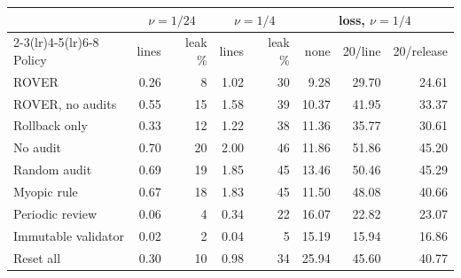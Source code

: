 \begin{tabular}{lrrrrrrr}
\toprule
 & \multicolumn{2}{c}{$\nu=1/24$} & \multicolumn{2}{c}{$\nu=1/4$} & \multicolumn{3}{c}{loss, $\nu=1/4$} \\
\cmidrule(lr){2-3}\cmidrule(lr){4-5}\cmidrule(lr){6-8}
Policy & lines & leak \% & lines & leak \% & none & 20/line & 20/release \\
\midrule
ROVER & 0.26 & 8 & 1.02 & 30 & 9.28 & 29.70 & 24.61 \\
ROVER, no audits & 0.55 & 15 & 1.58 & 39 & 10.37 & 41.95 & 33.37 \\
Rollback only & 0.33 & 12 & 1.22 & 38 & 11.36 & 35.77 & 30.61 \\
No audit & 0.70 & 20 & 2.00 & 46 & 11.86 & 51.86 & 45.20 \\
Random audit & 0.69 & 19 & 1.85 & 45 & 13.46 & 50.46 & 45.29 \\
Myopic rule & 0.67 & 18 & 1.83 & 45 & 11.50 & 48.08 & 40.66 \\
Periodic review & 0.06 & 4 & 0.34 & 22 & 16.07 & 22.82 & 23.07 \\
Immutable validator & 0.02 & 2 & 0.04 & 5 & 15.19 & 15.94 & 16.86 \\
Reset all & 0.30 & 10 & 0.98 & 34 & 25.94 & 45.60 & 40.77 \\
\bottomrule
\end{tabular}
